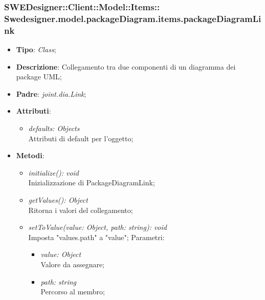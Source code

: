 \documentclass[../DefinizioneDiProdotto.tex]{subfiles}
\begin{document}
			\subsubsection[Swedesigner.model.packageDiagram.items.packageDiagramLink]{SWEDesigner::Client::Model::Items::\\Swedesigner.model.packageDiagram.items.packageDiagramLink}
			\hypertarget{SWEDesigner::Client::Model::Items::Swedesigner.model.packageDiagram.items.packageDiagramLink}{}
			\begin{itemize}
				\item \textbf{Tipo}: \emph{Class};
				\item \textbf{Descrizione}: Collegamento tra due componenti di un diagramma dei package UML;
				\item \textbf{Padre}: \emph{joint.dia.Link};
				\item \textbf{Attributi}:
				\begin{itemize}
					\item \emph{defaults: Objects}\\
					Attributi di default per l'oggetto;
				\end{itemize}
				\item \textbf{Metodi}:
				\begin{itemize}
					\item \emph{initialize(): void}\\
					Inizializzazione di PackageDiagramLink;
					\item \emph{getValues(): Object}\\
					Ritorna i valori del collegamento;
					\item \emph{setToValue(value: Object, path: string): void}\\
					Imposta "values.path" a "value";
					Parametri:
					\begin{itemize}
						\item \emph{value: Object} \\
						Valore da assegnare;
						\item \emph{path: string} \\
						Percorso al membro;
					\end{itemize}
				\end{itemize}
			\end{itemize}
			
\end{document}
